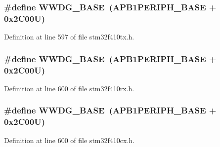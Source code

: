 \subsubsection[{\texorpdfstring{W\+W\+D\+G\+\_\+\+B\+A\+SE}{WWDG_BASE}}]{\setlength{\rightskip}{0pt plus 5cm}\#define W\+W\+D\+G\+\_\+\+B\+A\+SE~({\bf A\+P\+B1\+P\+E\+R\+I\+P\+H\+\_\+\+B\+A\+SE} + 0x2\+C00\+U)}\hypertarget{group___peripheral__registers__structures_ga9a5bf4728ab93dea5b569f5b972cbe62}{}\label{group___peripheral__registers__structures_ga9a5bf4728ab93dea5b569f5b972cbe62}


Definition at line 597 of file stm32f410tx.\+h.

\subsubsection[{\texorpdfstring{W\+W\+D\+G\+\_\+\+B\+A\+SE}{WWDG_BASE}}]{\setlength{\rightskip}{0pt plus 5cm}\#define W\+W\+D\+G\+\_\+\+B\+A\+SE~({\bf A\+P\+B1\+P\+E\+R\+I\+P\+H\+\_\+\+B\+A\+SE} + 0x2\+C00\+U)}\hypertarget{group___peripheral__registers__structures_ga9a5bf4728ab93dea5b569f5b972cbe62}{}\label{group___peripheral__registers__structures_ga9a5bf4728ab93dea5b569f5b972cbe62}


Definition at line 600 of file stm32f410rx.\+h.

\subsubsection[{\texorpdfstring{W\+W\+D\+G\+\_\+\+B\+A\+SE}{WWDG_BASE}}]{\setlength{\rightskip}{0pt plus 5cm}\#define W\+W\+D\+G\+\_\+\+B\+A\+SE~({\bf A\+P\+B1\+P\+E\+R\+I\+P\+H\+\_\+\+B\+A\+SE} + 0x2\+C00\+U)}\hypertarget{group___peripheral__registers__structures_ga9a5bf4728ab93dea5b569f5b972cbe62}{}\label{group___peripheral__registers__structures_ga9a5bf4728ab93dea5b569f5b972cbe62}


Definition at line 600 of file stm32f410cx.\+h.

